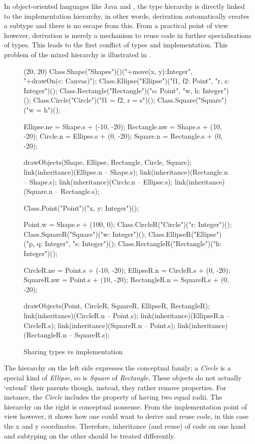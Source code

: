 In object-oriented languages like Java and \cpp, the type hierarchy
is directly linked to the implementation hierarchy, in other words,
derivation automatically creates a subtype and there is no escape from
this. From a practical point of view however, derivation is merely a
mechanism to reuse code in further specialisations of types. This leads
to the first conflict of types and implementation. This problem of
the mixed hierarchy is illustrated in 
\cite{simons_theory_2003-4}.

\begin{figure}[H]
	\centering
	\begin{emp}[classdiag](20, 20)
		Class.Shape("Shapes")()("+move(x, y):Integer", "+drawOn(c: Canvas)");
		Class.Ellipse("Ellipse")("f1, f2: Point", "r, s: Integer")();
		Class.Rectangle("Rectangle")("o: Point", "w, h: Integer")();
		Class.Circle("Circle")("{f1 = f2, r = s}")();
		Class.Square("Square")("{w = h}")();

		Ellipse.ne = Shape.s + (-10, -20);
		Rectangle.nw = Shape.s + (10, -20);
		Circle.n = Ellipse.s + (0, -20);
		Square.n = Rectangle.s + (0, -20);

		drawObjects(Shape, Ellipse, Rectangle, Circle, Square);
		link(inheritance)(Ellipse.n -- Shape.s);
		link(inheritance)(Rectangle.n -- Shape.s);
		link(inheritance)(Circle.n -- Ellipse.s);
		link(inheritance)(Square.n -- Rectangle.s);

		Class.Point("Point")("x, y: Integer")();

		Point.w = Shape.e + (100, 0);
		Class.CircleR("Circle")("r: Integer")();
		Class.SquareR("Square")("w: Integer")();
		Class.EllipseR("Ellipse")("p, q: Integer", "s: Integer")();
		Class.RectangleR("Rectangle")("h: Integer")();

		CircleR.ne = Point.s + (-10, -20);
		EllipseR.n = CircleR.s + (0, -20);
		SquareR.nw = Point.s + (10, -20);
		RectangleR.n = SquareR.s + (0, -20);

		drawObjects(Point, CircleR, SquareR, EllipseR, RectangleR);
		link(inheritance)(CircleR.n -- Point.s);
		link(inheritance)(EllipseR.n -- CircleR.s);
		link(inheritance)(SquareR.n -- Point.s);
		link(inheritance)(RectangleR.n -- SquareR.s);
	\end{emp}
	\caption{Sharing types vs implementation}
	\label{fig:implementationConflict}
\end{figure}

The hierarchy on the left side expresses the conceptual family; a
\emph{Circle} is a special kind of \emph{Ellipse}, so is \emph{Square}
of \emph{Rectangle}. These objects do not actually `extend' their
parents though, instead, they rather remove properties. For instance,
the \emph{Circle} includes the property of having two equal radii. The hierarchy
on the right is conceptual nonsense. From the implementation point of
view however, it shows how one could want to derive and reuse code, in
this case the x and y coordinates. Therefore, inheritance (and reuse) of
code on one hand and subtyping on the other should be treated differently.

